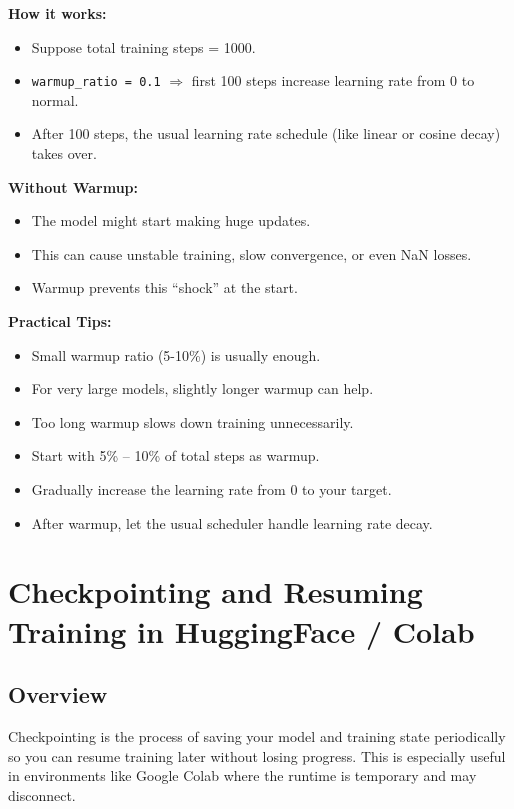 \textbf{How it works:}  
\begin{itemize}
    \item Suppose total training steps = 1000.  
    \item \texttt{warmup\_ratio = 0.1} $\Rightarrow$ first 100 steps increase learning rate from 0 to normal.  
    \item After 100 steps, the usual learning rate schedule (like linear or cosine decay) takes over.  
\end{itemize}

\textbf{Without Warmup:}  
\begin{itemize}
    \item The model might start making huge updates.  
    \item This can cause unstable training, slow convergence, or even NaN losses.  
    \item Warmup prevents this “shock” at the start.
\end{itemize}

\textbf{Practical Tips:}  
\begin{itemize}
    \item Small warmup ratio (5-10\%) is usually enough.  
    \item For very large models, slightly longer warmup can help.  
    \item Too long warmup slows down training unnecessarily.  
\end{itemize}

\begin{tcolorbox}[colback=green!5!white,colframe=green!75!black,title=Easy Rule of Thumb]
\begin{itemize}
    \item Start with 5\% -- 10\% of total steps as warmup.  
    \item Gradually increase the learning rate from 0 to your target.  
    \item After warmup, let the usual scheduler handle learning rate decay.
\end{itemize}
\end{tcolorbox}


\section{Checkpointing and Resuming Training in HuggingFace / Colab}

\subsection{Overview}
Checkpointing is the process of saving your model and training state periodically so you can resume training later without losing progress. This is especially useful in environments like Google Colab where the runtime is temporary and may disconnect.

